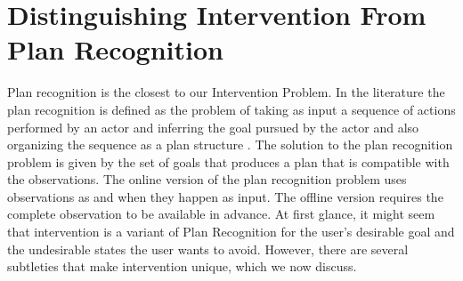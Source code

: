 \section{Distinguishing Intervention From Plan Recognition}
Plan recognition is the closest to our Intervention Problem. 
In the literature the plan recognition is defined as the problem of taking as input a sequence of actions performed by an actor and inferring the goal pursued by the actor and also organizing the sequence as a plan structure \cite{kautz1986generalized,schmidt1978}. 
The solution to the plan recognition problem is given by the set of goals that produces a plan that is compatible with the observations. 
The online version of the plan recognition problem uses observations as and when they happen as input. 
The offline version requires the complete observation to be available in advance. 
At first glance, it might seem that intervention is a variant of Plan Recognition for the user's desirable goal and the undesirable states the user wants to avoid. 
However, there are several subtleties that make intervention unique, which we now discuss.
